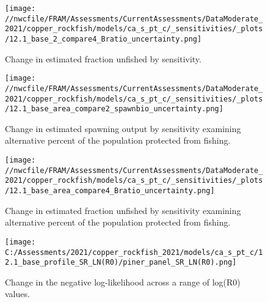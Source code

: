\documentclass[11pt,
  english,
  a4paper,
]{article}
\begin{document}
\begin{figure}
\centering
\texttt{[image: //nwcfile/FRAM/Assessments/CurrentAssessments/DataModerate\_2021/copper\_rockfish/models/ca\_s\_pt\_c/\_sensitivities/\_plots/12.1\_base\_2\_compare4\_Bratio\_uncertainty.png]}
\caption{Change in estimated fraction unfished by sensitivity.\label{fig:sens-depl-2}}
\end{figure}

\tagmcend\tagstructend

\newpage


\begin{figure}
\centering
\texttt{[image: //nwcfile/FRAM/Assessments/CurrentAssessments/DataModerate\_2021/copper\_rockfish/models/ca\_s\_pt\_c/\_sensitivities/\_plots/12.1\_base\_area\_compare2\_spawnbio\_uncertainty.png]}
\caption{Change in estimated spawning output by sensitivity examining alternative percent of the population protected from fishing.\label{fig:sens-area-ssb}}
\end{figure}

\tagmcend\tagstructend


\begin{figure}
\centering
\texttt{[image: //nwcfile/FRAM/Assessments/CurrentAssessments/DataModerate\_2021/copper\_rockfish/models/ca\_s\_pt\_c/\_sensitivities/\_plots/12.1\_base\_area\_compare4\_Bratio\_uncertainty.png]}
\caption{Change in estimated fraction unfished by sensitivity examining alternative percent of the population protected from fishing.\label{fig:sens-area-depl}}
\end{figure}

\tagmcend\tagstructend

\newpage


\begin{figure}
\centering
\texttt{[image: C:/Assessments/2021/copper\_rockfish\_2021/models/ca\_s\_pt\_c/12.1\_base\_profile\_SR\_LN(R0)/piner\_panel\_SR\_LN(R0).png]}
\caption{Change in the negative log-likelihood across a range of log(R0) values.\label{fig:r0-profile}}
\end{figure}
\end{document}

